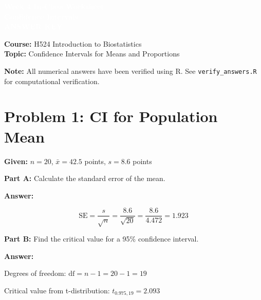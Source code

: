 \documentclass[11pt]{article}
\title{}
\author{}
\date{}
\begin{document}
\begin{tcolorbox}[colback=osaorange,colframe=black,boxrule=2pt,arc=0pt,left=6pt,right=6pt,top=10pt,bottom=10pt]
\centering
\textcolor{white}{\textbf{\Large Week 4 In-Class Worksheet}}\\
\textcolor{white}{\textbf{\large Confidence Intervals}}\\
\textcolor{white}{\textbf{ANSWER KEY}}
\end{tcolorbox}

\vspace{8pt}

\noindent\textbf{Course:} H524 Introduction to Biostatistics\\
\textbf{Topic:} Confidence Intervals for Means and Proportions

\vspace{8pt}

\begin{tcolorbox}[colback=yellow!10,colframe=black,boxrule=1pt]
\textbf{Note:} All numerical answers have been verified using R. See \texttt{verify\_answers.R} for computational verification.
\end{tcolorbox}

\vspace{12pt}

\section{Problem 1: CI for Population Mean}

\textbf{Given:} $n = 20$, $\bar{x} = 42.5$ points, $s = 8.6$ points

\vspace{6pt}

\textbf{Part A:} Calculate the standard error of the mean.

\textcolor{answergreen}{\textbf{Answer:}}

$$\text{SE} = \frac{s}{\sqrt{n}} = \frac{8.6}{\sqrt{20}} = \frac{8.6}{4.472} = 1.923$$

\vspace{6pt}

\textbf{Part B:} Find the critical value for a 95\% confidence interval.

\textcolor{answergreen}{\textbf{Answer:}}

Degrees of freedom: $\text{df} = n - 1 = 20 - 1 = 19$

Critical value from t-distribution: $t_{0.975, 19} = 2.093$
\end{document}
